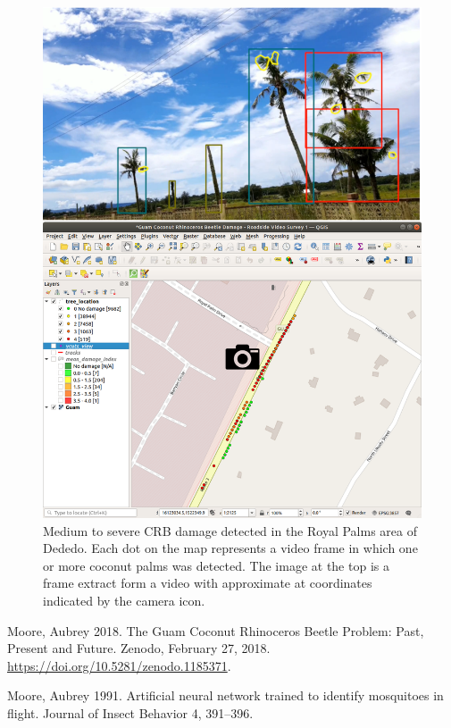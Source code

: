 \documentclass[letterpaper, 11pt]{scrartcl}
\begin{document}
\begin{figure}
	\centering
	\includegraphics[width=0.8\linewidth]{images/royal-palms-map-framei.png}
	\caption{Medium to severe CRB damage detected in the Royal Palms area of Dededo. Each dot on the map represents a video frame in which one or more coconut palms was detected. The image at the top is a frame extract form a video with approximate at coordinates indicated by the camera icon.}
	\label{fig:royal-palms-frame}
\end{figure}


\begin{thebibliography}{9}


Moore, Aubrey 2018. The Guam Coconut Rhinoceros Beetle Problem: Past, Present and Future. Zenodo, February 27, 2018. \url{https://doi.org/10.5281/zenodo.1185371}.

Moore, Aubrey 1991. Artificial neural network trained to identify mosquitoes in flight. Journal of Insect Behavior 4, 391–396.

\end{thebibliography}
\end{document}
